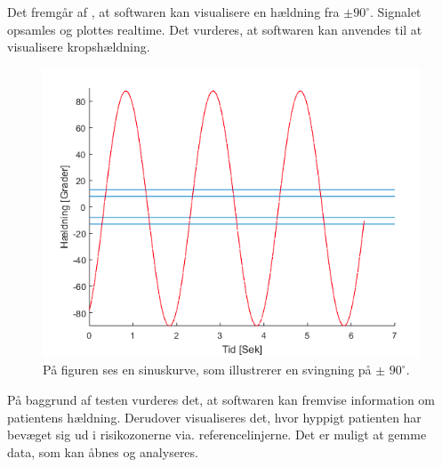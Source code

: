 \noindent Det fremgår af , at softwaren kan visualisere en hældning fra $\pm90^{\circ}$. Signalet opsamles og plottes realtime. Det vurderes, at softwaren kan anvendes til at visualisere kropshældning. 
\begin{figure}[H] 
	\centering 
	\includegraphics[scale=0.5]{figures/cProblemloesning/sinus.PNG}
	\caption{På figuren ses en sinuskurve, som illustrerer en svingning på $\pm$ $90^{\circ}$.}
	\label{Fig:software_sinus}
\end{figure}
\noindent På baggrund af testen vurderes det, at softwaren kan fremvise information om patientens hældning. Derudover visualiseres det, hvor hyppigt patienten har bevæget sig ud i risikozonerne via. referencelinjerne. Det er muligt at gemme data, som kan åbnes og analyseres. 